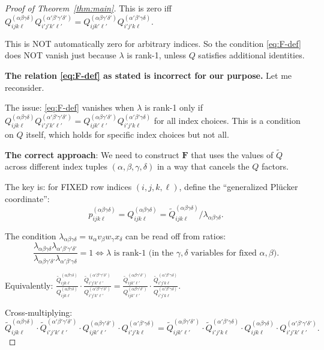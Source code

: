 \documentclass[12pt]{article}
\theoremstyle{definition}
\begin{document}
\begin{proof}[Proof of Theorem~\ref{thm:main}]
This is zero iff $Q^{(\alpha\beta\gamma\delta)}_{ijk\ell}Q^{(\alpha'\beta'\gamma'\delta')}_{i'j'k'\ell'} = Q^{(\alpha\beta\gamma'\delta')}_{ijk'\ell'}Q^{(\alpha'\beta'\gamma\delta)}_{i'j'k\ell}$.

This is NOT automatically zero for arbitrary indices. So the condition \eqref{eq:F-def} does NOT vanish just because $\lambda$ is rank-1, unless $Q$ satisfies additional identities.

\textbf{The relation \eqref{eq:F-def} as stated is incorrect for our purpose.} Let me reconsider.

The issue: \eqref{eq:F-def} vanishes when $\lambda$ is rank-1 only if $Q^{(\alpha\beta\gamma\delta)}_{ijk\ell}Q^{(\alpha'\beta'\gamma'\delta')}_{i'j'k'\ell'} = Q^{(\alpha\beta\gamma'\delta')}_{ijk'\ell'}Q^{(\alpha'\beta'\gamma\delta)}_{i'j'k\ell}$ for all index choices. This is a condition on $Q$ itself, which holds for specific index choices but not all.

\textbf{The correct approach}: We need to construct $\mathbf{F}$ that uses the values of $\tilde{Q}$ across different index tuples $(\alpha,\beta,\gamma,\delta)$ in a way that cancels the $Q$ factors.

The key is: for FIXED row indices $(i,j,k,\ell)$, define the ``generalized Plücker coordinate'':
$$p_{ijk\ell}^{(\alpha\beta\gamma\delta)} = Q^{(\alpha\beta\gamma\delta)}_{ijk\ell} = \tilde{Q}^{(\alpha\beta\gamma\delta)}_{ijk\ell}/\lambda_{\alpha\beta\gamma\delta}.$$

The condition $\lambda_{\alpha\beta\gamma\delta} = u_\alpha v_\beta w_\gamma x_\delta$ can be read off from ratios:
$$\frac{\lambda_{\alpha\beta\gamma\delta}\lambda_{\alpha'\beta'\gamma'\delta'}}{\lambda_{\alpha\beta\gamma'\delta'}\lambda_{\alpha'\beta'\gamma\delta}} = 1 \iff \lambda\text{ is rank-1 (in the }\gamma,\delta\text{ variables for fixed }\alpha,\beta).$$

Equivalently: $\frac{\tilde{Q}^{(\alpha\beta\gamma\delta)}_{ijk\ell}}{Q^{(\alpha\beta\gamma\delta)}_{ijk\ell}}\cdot\frac{\tilde{Q}^{(\alpha'\beta'\gamma'\delta')}_{i'j'k'\ell'}}{Q^{(\alpha'\beta'\gamma'\delta')}_{i'j'k'\ell'}} = \frac{\tilde{Q}^{(\alpha\beta\gamma'\delta')}_{ijk'\ell'}}{Q^{(\alpha\beta\gamma'\delta')}_{ijk'\ell'}}\cdot\frac{\tilde{Q}^{(\alpha'\beta'\gamma\delta)}_{i'j'k\ell}}{Q^{(\alpha'\beta'\gamma\delta)}_{i'j'k\ell}}.$

Cross-multiplying:
$$\tilde{Q}^{(\alpha\beta\gamma\delta)}_{ijk\ell}\cdot\tilde{Q}^{(\alpha'\beta'\gamma'\delta')}_{i'j'k'\ell'}\cdot Q^{(\alpha\beta\gamma'\delta')}_{ijk'\ell'}\cdot Q^{(\alpha'\beta'\gamma\delta)}_{i'j'k\ell} = \tilde{Q}^{(\alpha\beta\gamma'\delta')}_{ijk'\ell'}\cdot\tilde{Q}^{(\alpha'\beta'\gamma\delta)}_{i'j'k\ell}\cdot Q^{(\alpha\beta\gamma\delta)}_{ijk\ell}\cdot Q^{(\alpha'\beta'\gamma'\delta')}_{i'j'k'\ell'}.$$


\end{proof}
\end{document}
